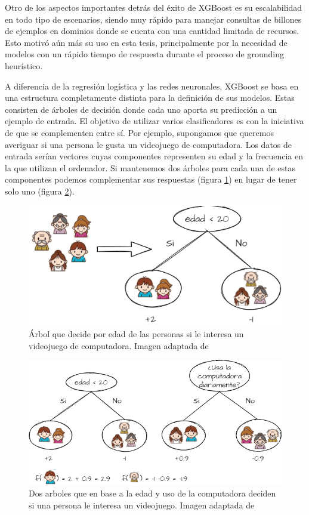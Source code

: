Otro de los aspectos importantes detrás del éxito de XGBoost es su escalabilidad
en todo tipo de escenarios, siendo muy rápido para manejar consultas de billones
de ejemplos en dominios donde se cuenta con una cantidad limitada de recursos.
Esto motivó aún más su uso en esta tesis, principalmente por la necesidad de
modelos con un rápido tiempo de respuesta durante el proceso de grounding
heurístico.

A diferencia de la regresión logística y las redes neuronales, XGBoost se basa
en una estructura completamente distinta para la definición de sus modelos.
Estas consisten de árboles de decisión donde cada uno aporta su predicción a un
ejemplo de entrada. El objetivo de utilizar varios clasificadores es con la
iniciativa de que se complementen entre sí. Por ejemplo, supongamos que queremos
averiguar si una persona le gusta un videojuego de computadora. Los datos de
entrada serían vectores cuyas componentes representen su edad y la frecuencia en
la que utilizan el ordenador. Si mantenemos dos árboles para cada una de estas
componentes podemos complementar sus respuestas (figura \ref{fig:xgboost_tree})
en lugar de tener solo uno (figura \ref{fig:xgboost_two_tree}).

\begin{figure}
    \centering
    \includegraphics[scale=0.4]{figures/xgboost_tree.png}
    \caption{Árbol que decide por edad de las personas si le interesa un
    videojuego de computadora. Imagen adaptada de \citep{Tianqi-2016}}
    \label{fig:xgboost_tree}
\end{figure}

\begin{figure}
    \centering
    \includegraphics[scale=0.4]{figures/xgboost_two_tree.png}
    \caption{Dos arboles que en base a la edad y uso de la computadora deciden
    si una persona le interesa un videojuego. Imagen adaptada de
    \citep{Tianqi-2016}}
    \label{fig:xgboost_two_tree}
\end{figure}

